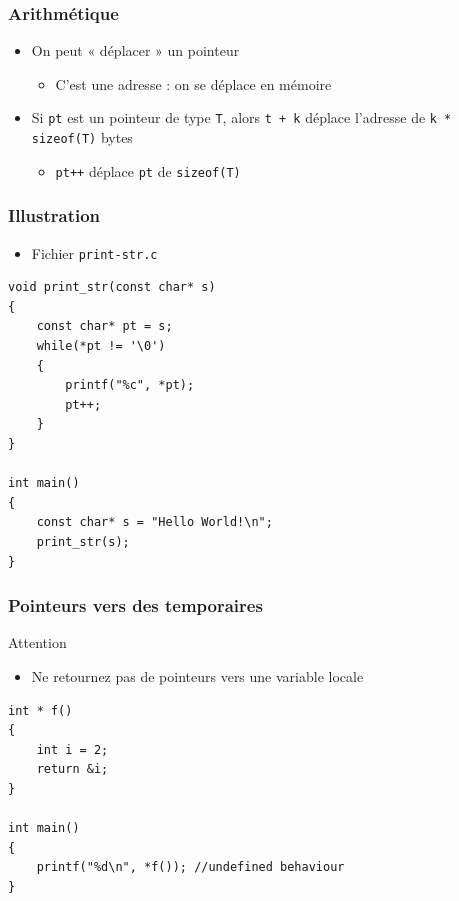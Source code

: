 \begin{frame}
\frametitle{Arithmétique}
\begin{itemize}[<+->]
\item On peut « déplacer » un pointeur
	\begin{itemize}
	\item C'est une adresse : on se déplace en mémoire
	\end{itemize}
\item Si \texttt{pt} est un pointeur de type \texttt{T}, alors \texttt{t + k} déplace l'adresse de \lstinline|k * sizeof(T)| bytes
	\begin{itemize}
	\item \texttt{pt++} déplace \texttt{pt} de \lstinline|sizeof(T)|
	\end{itemize}
\end{itemize}
\end{frame}

\begin{frame}[containsverbatim]
\frametitle{Illustration}
\begin{itemize}
\item Fichier \texttt{print-str.c}
\end{itemize}
\begin{lstlisting}
void print_str(const char* s)
{
	const char* pt = s;
	while(*pt != '\0')
	{
		printf("%c", *pt); 
		pt++;
	}
}

int main()
{
	const char* s = "Hello World!\n";
	print_str(s);
}
\end{lstlisting}
\end{frame}

\begin{frame}[containsverbatim]
\frametitle{Pointeurs vers des temporaires}
\begin{alertblock}{Attention}
	\begin{itemize}
	\item Ne retournez pas de pointeurs vers une variable locale
	\end{itemize}
\end{alertblock}
\begin{lstlisting}
int * f()
{
	int i = 2;
	return &i;
}

int main()
{
	printf("%d\n", *f()); //undefined behaviour
}
\end{lstlisting}
\end{frame}

